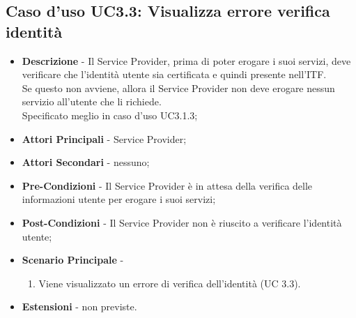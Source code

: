 \subsection{Caso d'uso UC3.3: Visualizza errore verifica identità}
\begin{itemize}
	\item \textbf{Descrizione} - Il Service Provider, prima di poter erogare i suoi servizi, deve verificare che l'identità utente sia certificata e quindi presente nell'\gls{ITF}.\\
	Se questo non avviene, allora il Service Provider non deve erogare nessun servizio all'utente che li richiede.\\
	Specificato meglio in caso d'uso UC3.1.3;
	\item \textbf{Attori Principali} - Service Provider;
	\item \textbf{Attori Secondari} - nessuno;
	\item \textbf{Pre-Condizioni} - Il Service Provider è in attesa della verifica delle informazioni utente per erogare i suoi servizi;
	\item \textbf{Post-Condizioni} - Il Service Provider non è riuscito a verificare l'identità utente;
	\item \textbf{Scenario Principale} -
	\begin{enumerate}
		\item Viene visualizzato un errore di verifica dell'identità (UC 3.3).
	\end{enumerate}
	\item \textbf{Estensioni} - non previste.
\end{itemize}
